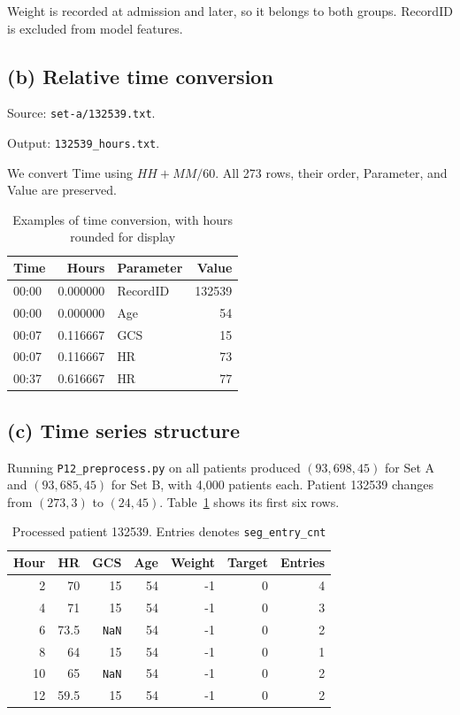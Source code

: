 \documentclass[11pt,a4paper]{article}
\begin{document}
Weight is recorded at admission and later, so it belongs to both groups.
RecordID is excluded from model features.

\subsection*{(b) Relative time conversion}
Source: \texttt{set-a/132539.txt}.

Output: \texttt{132539\_hours.txt}.

We convert Time using $HH+MM/60$. All 273 rows, their order, Parameter, and Value are preserved.

\begin{table}[H]
\centering
\caption{Examples of time conversion, with hours rounded for display}
\begin{tabular}{lrlr}
\toprule
Time & Hours & Parameter & Value\\
\midrule
00:00 & 0.000000 & RecordID & 132539 \\
00:00 & 0.000000 & Age & 54 \\
00:07 & 0.116667 & GCS & 15 \\
00:07 & 0.116667 & HR & 73 \\
00:37 & 0.616667 & HR & 77 \\
\bottomrule
\end{tabular}
\end{table}

\subsection*{(c) Time series structure}
Running \texttt{P12\_preprocess.py} on all patients produced $(93{,}698,45)$ for Set A
and $(93{,}685,45)$ for Set B, with 4,000 patients each.
Patient 132539 changes from $(273,3)$ to $(24,45)$. Table~\ref{tab:processed} shows its first six rows.

\begin{table}[H]
\centering
\caption{Processed patient 132539. Entries denotes \texttt{seg\_entry\_cnt}}\label{tab:processed}
\begin{tabular}{rrrrrrr}
\toprule
Hour & HR & GCS & Age & Weight & Target & Entries\\
\midrule
2 & 70 & 15 & 54 & -1 & 0 & 4 \\
4 & 71 & 15 & 54 & -1 & 0 & 3 \\
6 & 73.5 & \texttt{NaN} & 54 & -1 & 0 & 2 \\
8 & 64 & 15 & 54 & -1 & 0 & 1 \\
10 & 65 & \texttt{NaN} & 54 & -1 & 0 & 2 \\
12 & 59.5 & 15 & 54 & -1 & 0 & 2 \\
\bottomrule
\end{tabular}
\end{table}
\end{document}
